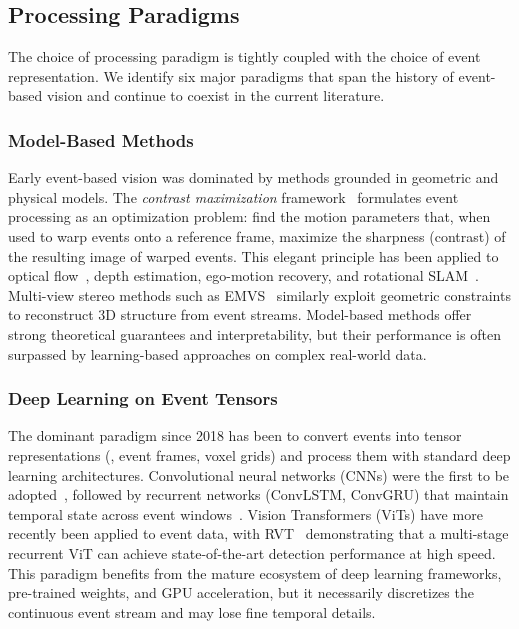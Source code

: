 \subsection{Processing Paradigms}
\label{sec:pre_paradigm}

The choice of processing paradigm is tightly coupled with the choice of event representation. We identify six major paradigms that span the history of event-based vision and continue to coexist in the current literature.


\subsubsection{Model-Based Methods}
\label{sec:paradigm_model}

Early event-based vision was dominated by methods grounded in geometric and physical models. The \textit{contrast maximization} framework~\cite{gallego2018cmax} formulates event processing as an optimization problem: find the motion parameters that, when used to warp events onto a reference frame, maximize the sharpness (contrast) of the resulting image of warped events. This elegant principle has been applied to optical flow~\cite{shiba2024cmaxsecrets}, depth estimation, ego-motion recovery, and rotational SLAM~\cite{shiba2024cmaxslam}. Multi-view stereo methods such as EMVS~\cite{rebecq2018emvs} similarly exploit geometric constraints to reconstruct 3D structure from event streams. Model-based methods offer strong theoretical guarantees and interpretability, but their performance is often surpassed by learning-based approaches on complex real-world data.


\subsubsection{Deep Learning on Event Tensors}
\label{sec:paradigm_dl}

The dominant paradigm since 2018 has been to convert events into tensor representations (\eg, event frames, voxel grids) and process them with standard deep learning architectures. Convolutional neural networks (CNNs) were the first to be adopted~\cite{maqueda2018steering,rebecq2019e2vid}, followed by recurrent networks (ConvLSTM, ConvGRU) that maintain temporal state across event windows~\cite{rebecq2019e2vid,ercan2024hypere2vid}. Vision Transformers (ViTs) have more recently been applied to event data, with RVT~\cite{gehrig2023rvt} demonstrating that a multi-stage recurrent ViT can achieve state-of-the-art detection performance at high speed. This paradigm benefits from the mature ecosystem of deep learning frameworks, pre-trained weights, and GPU acceleration, but it necessarily discretizes the continuous event stream and may lose fine temporal details.


